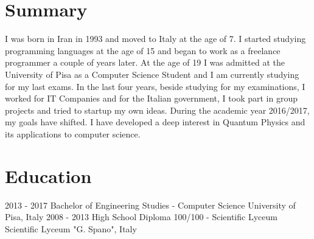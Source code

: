 \documentclass[]{friggeri-cv} %
\begin{document}

\section{Summary}
\vspace{-3mm}
I was born in Iran in 1993 and moved to Italy at the age of 7. I started studying programming languages at the age of 15 and began to work as a freelance programmer a couple of years later. At the age of 19 I was admitted at the University of Pisa as a Computer Science Student and I am currently studying for my last exams. In the last four years, beside studying for my examinations, I worked for IT Companies and for the Italian government, I took part in group projects and tried to startup my own ideas. During the academic year 2016/2017, my goals have shifted. I have developed a deep interest in Quantum Physics and its applications to computer science.


\section{Education}
\vspace{-3mm}
\begin{entrylist}
\entry
{2013 - 2017}
{Bachelor {\normalfont\small{of Engineering Studies - Computer Science}}}
{University of Pisa, Italy}
{\vspace{-3mm}}
\entry
{2008 - 2013}
{High School Diploma {\normalfont\small{100/100 - Scientific Lyceum}}}
{Scientific Lyceum "G. Spano", Italy}
{\vspace{-5mm}}
\end{entrylist}


\patchcmd{\entry}{11.8cm}{14.8cm}{}{}
\end{document}
